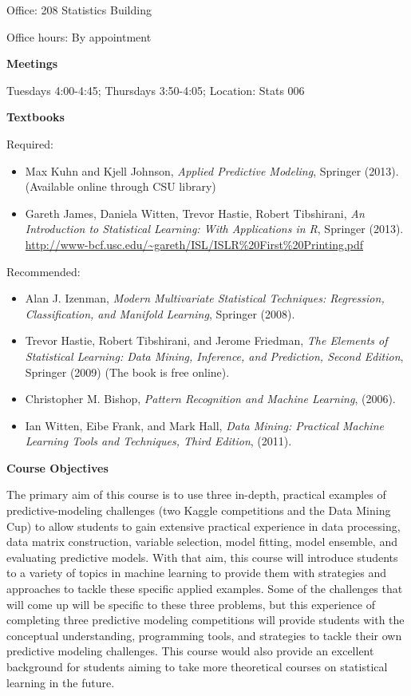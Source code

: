 \documentclass[11pt,oneside]{amsart}
\newcommand{\header}[1]{\bigbreak\textbf{#1}}
\begin{document}
Office: 208 Statistics Building

Office hours: By appointment



\header{Meetings}

Tuesdays 4:00-4:45; Thursdays 3:50-4:05; Location: Stats 006



\header{Textbooks}

Required: 
\begin{itemize}
\item Max Kuhn and Kjell Johnson, \emph{Applied Predictive
  Modeling}, Springer (2013). (Available online through CSU library)
 
 \item Gareth James, Daniela Witten, Trevor Hastie, Robert
Tibshirani, \emph{An Introduction to Statistical Learning: With
  Applications in R}, Springer (2013). \url{http://www-bcf.usc.edu/~gareth/ISL/ISLR%20First%20Printing.pdf}
\end{itemize}

Recommended: 
\begin{itemize}
\item Alan J. Izenman, {\it Modern Multivariate Statistical Techniques: Regression, Classification, and Manifold Learning}, Springer (2008).
 
 \item Trevor Hastie, Robert Tibshirani, and Jerome Friedman, {\it The Elements of Statistical Learning: Data Mining, Inference, and Prediction, Second Edition}, Springer (2009) (The book is free online).

\item Christopher M. Bishop, {\it Pattern Recognition and Machine Learning}, (2006).
\item Ian Witten, Eibe Frank, and Mark Hall, {\it Data Mining: Practical Machine Learning Tools and Techniques, Third Edition}, (2011).
\end{itemize}





\header{Course Objectives}

The primary aim of this course is to use three in-depth, practical
examples of predictive-modeling challenges (two Kaggle competitions
and the Data Mining Cup) to allow students to gain extensive practical
experience in data processing, data matrix construction, variable selection, model fitting, model ensemble, and evaluating predictive
models. With that aim, this course will introduce students to a
variety of topics in machine learning to provide them with strategies
and approaches to tackle these specific applied examples. Some of the
challenges that will come up will be specific to these three problems,
but this experience of completing three predictive modeling
competitions will provide students with the conceptual understanding, programming tools, and
strategies to tackle their own predictive modeling challenges. This
course would also provide an excellent background for students aiming
to take more theoretical courses on statistical learning in the
future. 
\vspace{.2cm}
\end{document}
